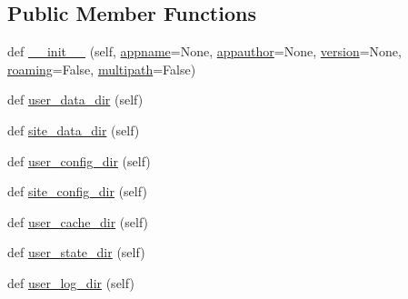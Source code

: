 \subsection*{Public Member Functions}
\begin{DoxyCompactItemize}
\item 
def \hyperlink{classpkg__resources_1_1__vendor_1_1appdirs_1_1AppDirs_a21e4f9ef5ad4d889cec45a9818511fee}{\+\_\+\+\_\+init\+\_\+\+\_\+} (self, \hyperlink{classpkg__resources_1_1__vendor_1_1appdirs_1_1AppDirs_afed8cca9642ffb41bd6e08a7cd1c078a}{appname}=None, \hyperlink{classpkg__resources_1_1__vendor_1_1appdirs_1_1AppDirs_a69ef562eba9aecf3e8d06c73ebb6e1da}{appauthor}=None, \hyperlink{classpkg__resources_1_1__vendor_1_1appdirs_1_1AppDirs_af0b4120c1952529d4b9cf453a36a1939}{version}=None, \hyperlink{classpkg__resources_1_1__vendor_1_1appdirs_1_1AppDirs_aaa511bab76ea5c82e80096050df5ce87}{roaming}=False, \hyperlink{classpkg__resources_1_1__vendor_1_1appdirs_1_1AppDirs_a4292bc9bd6d97a7a696f731d4955ebf9}{multipath}=False)
\item 
def \hyperlink{classpkg__resources_1_1__vendor_1_1appdirs_1_1AppDirs_adea638267fd19143082c4d6979a8c5db}{user\+\_\+data\+\_\+dir} (self)
\item 
def \hyperlink{classpkg__resources_1_1__vendor_1_1appdirs_1_1AppDirs_a4bc3634149b8a1ef69b4f35c10d03744}{site\+\_\+data\+\_\+dir} (self)
\item 
def \hyperlink{classpkg__resources_1_1__vendor_1_1appdirs_1_1AppDirs_afa94999b6d252c7c7975b0aa8b97069d}{user\+\_\+config\+\_\+dir} (self)
\item 
def \hyperlink{classpkg__resources_1_1__vendor_1_1appdirs_1_1AppDirs_a2973eb14757f6ff1d36b19fef844d5eb}{site\+\_\+config\+\_\+dir} (self)
\item 
def \hyperlink{classpkg__resources_1_1__vendor_1_1appdirs_1_1AppDirs_a8a6e09aaf39dcfbd48e121d726e9d43e}{user\+\_\+cache\+\_\+dir} (self)
\item 
def \hyperlink{classpkg__resources_1_1__vendor_1_1appdirs_1_1AppDirs_a402631e0d5119be68268db209f74acaf}{user\+\_\+state\+\_\+dir} (self)
\item 
def \hyperlink{classpkg__resources_1_1__vendor_1_1appdirs_1_1AppDirs_a0f3f5a4cfae2fe199c1cd9abfd2eabf0}{user\+\_\+log\+\_\+dir} (self)
\end{DoxyCompactItemize}

